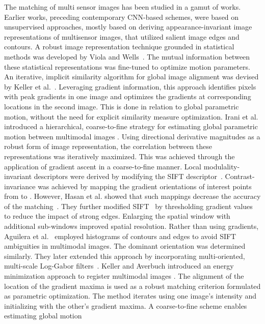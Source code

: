 \documentclass[10pt,journal]{IEEEtran}\usepackage{amsfonts}
\begin{document}
The matching of multi sensor images has been studied in a gamut of works.
Earlier works, preceding contemporary CNN-based schemes, were based on
unsupervised approaches, mostly based on deriving appearance-invariant image
representations of multisensor images, that utilized salient image edges and
contours. A robust image representation technique grounded in statistical
methods was developed by Viola and Wells~\cite{Viola:1997:AMM:263008.263015}. The mutual information between these statistical representations was
fine-tuned to optimize motion parameters. An iterative, implicit similarity
algorithm for global image alignment was devised by Keller et al.~\cite {keller2006multisensor}. Leveraging gradient information, this approach
identifies pixels with peak gradients in one image and optimizes the
gradients at corresponding locations in the second image. This is done in
relation to global parametric motion, without the need for explicit
similarity measure optimization. Irani et al. introduced a hierarchical,
coarse-to-fine strategy for estimating global parametric motion between
multimodal images \cite{irani1998robust}. Using directional derivative
magnitudes as a robust form of image representation, the correlation between
these representations was iteratively maximized. This was achieved through
the application of gradient ascent in a coarse-to-fine manner.
Local modulality-invariant descriptors were derived by modifying the SIFT
descriptor~\cite{chen2009real,MI-SIFT}. Contrast-invariance was achieved by
mapping the gradient orientations of interest points from  to . However, Hasan et al. showed that such mappings decrease the accuracy of the matching~\cite{hossain2011improved}. They further modified SIFT~\cite {hasan2012modified} by thresholding gradient values to reduce the impact of
strong edges. Enlarging the spatial window with additional sub-windows
improved spatial resolution. Rather than using gradients, Aguilera et al.~\cite{aguilera2012multispectral} employed histograms of contours and edges
to avoid SIFT ambiguities in multimodal images. The dominant orientation was
determined similarly. They later extended this approach by incorporating
multi-oriented, multi-scale Log-Gabor filters~\cite{lghd2015}. Keller and
Averbuch introduced an energy minimization approach to register multimodal
images \cite{1191008}. The alignment of the location of the gradient maxima is used as a
robust matching criterion formulated as parametric optimization. The method
iterates using one image's intensity and initializing with the other's
gradient maxima. A coarse-to-fine scheme enables estimating global motion
\end{document}
